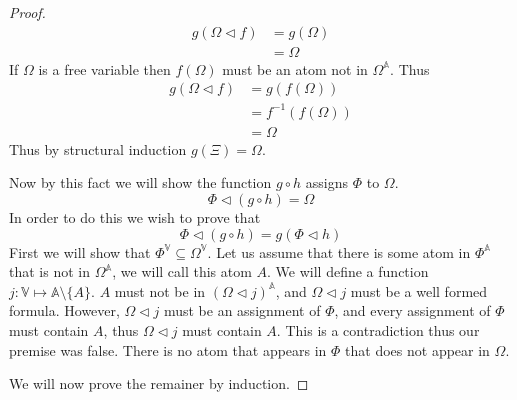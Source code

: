 \documentclass{article}
\begin{document}
\begin{proof}
\begin{align*}
   g (\Omega \lhd f)
&= g (\Omega) \tag{Definition of Assignment} \\
&= \Omega     \tag{Definition of $g$}
\end{align*}
If $\Omega$ is a free variable then $f (\Omega)$ must be an atom not in $\Omega^\mathbb{A}$.
Thus
\begin{align*}
   g (\Omega \lhd f)
&= g (f (\Omega)) \tag{Definition of Assignment} \\
&= f^{-1} (f (\Omega)) \tag{Definition of $g$} \\
&= \Omega
\end{align*}
Thus by structural induction $g(\Xi) = \Omega$.

Now by this fact we will show the function $g \circ h$ assigns $\Phi$ to $\Omega$.
\begin{equation*}
\Phi \lhd (g \circ h) = \Omega
\end{equation*}
In order to do this we wish to prove that
\begin{equation*}
\Phi \lhd (g \circ h) = g (\Phi \lhd h)
\end{equation*}
First we will show that $\Phi^\mathbb{V} \subseteq \Omega^\mathbb{V}$.
Let us assume that there is some atom in $\Phi^\mathbb{A}$ that is not in $\Omega^\mathbb{A}$, we will call this atom $A$.
We will define a function $j : \mathbb{V} \mapsto \mathbb{A} \setminus \{A\}$.
$A$ must not be in $(\Omega \lhd j)^\mathbb{A}$, and $\Omega \lhd j$ must be a well formed formula.
However, $\Omega \lhd j$ must be an assignment of $\Phi$, and every assignment of $\Phi$ must contain $A$, thus $\Omega \lhd j$ must contain $A$.
This is a contradiction thus our premise was false.
There is no atom that appears in $\Phi$ that does not appear in $\Omega$.

We will now prove the remainer by induction.


\end{proof}
\end{document}
